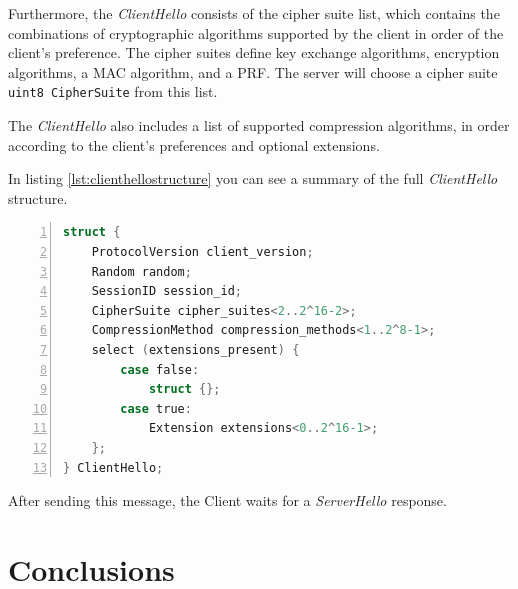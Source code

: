 \documentclass[sigconf, screen]{acmart}
\begin{document}
Furthermore, the \textit{ClientHello} consists of the cipher suite list, which contains the combinations of cryptographic algorithms supported by the client in order of the client's preference. The cipher suites define key exchange algorithms, encryption algorithms, a MAC algorithm, and a PRF. The server will choose a cipher suite \lstinline[language=C]{uint8 CipherSuite} from this list. 

The \textit{ClientHello} also includes a list of supported compression algorithms, in order according to the client's preferences and optional extensions.

In listing \ref{lst:clienthellostructure} you can see a summary of the full \textit{ClientHello} structure.
\begin{lstlisting}[language=C,  tabsize=4, numbers=left, xleftmargin=5.0ex, basicstyle=\footnotesize, breakatwhitespace=false, breaklines=true, frame=tb, caption=\textit{ClientHello} structure \cite{TLS_v1_2}., label=lst:clienthellostructure]
struct {
	ProtocolVersion client_version;
	Random random;
	SessionID session_id;
	CipherSuite cipher_suites<2..2^16-2>;
	CompressionMethod compression_methods<1..2^8-1>;
	select (extensions_present) {
		case false:
			struct {};
		case true:
			Extension extensions<0..2^16-1>;
	};
} ClientHello;
\end{lstlisting}

After sending this message, the Client waits for a \textit{ServerHello} response.
\section{Conclusions}
\label{s:conclusions}
\appendix
\end{document}
